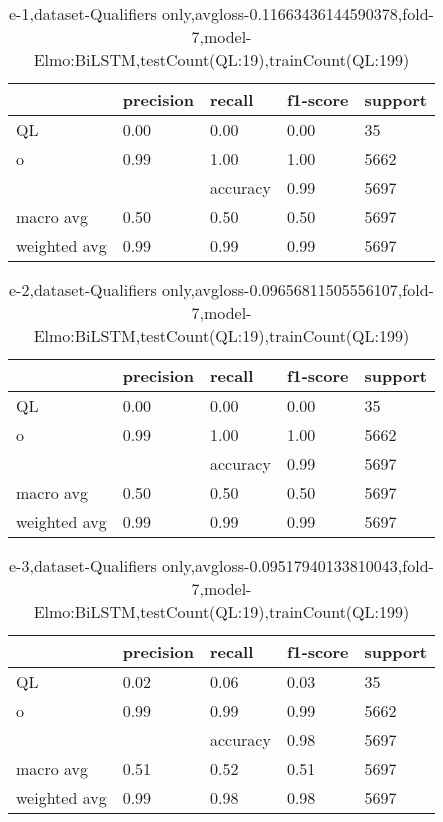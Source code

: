 \begin{table}[!ht] 
\centering
\caption{e-1,dataset-Qualifiers only,avgloss-0.11663436144590378,fold-7,model-Elmo:BiLSTM,testCount(QL:19),trainCount(QL:199)}\label{e-1data-qualS.tsv}
\begin{tabularx}{300pt}{|X|X|X|X|X|}
\hline
&precision&recall&f1-score&support\\
\hline
QL&0.00&0.00&0.00&35\\
\hline
o&0.99&1.00&1.00&5662\\
\hline
&&accuracy&0.99&5697\\
\hline
macro avg&0.50&0.50&0.50&5697\\
\hline
weighted avg&0.99&0.99&0.99&5697\\
\hline
\end{tabularx}
\end{table}
\begin{table}[!ht] 
\centering
\caption{e-2,dataset-Qualifiers only,avgloss-0.09656811505556107,fold-7,model-Elmo:BiLSTM,testCount(QL:19),trainCount(QL:199)}\label{e-2data-qualS.tsv}
\begin{tabularx}{300pt}{|X|X|X|X|X|}
\hline
&precision&recall&f1-score&support\\
\hline
QL&0.00&0.00&0.00&35\\
\hline
o&0.99&1.00&1.00&5662\\
\hline
&&accuracy&0.99&5697\\
\hline
macro avg&0.50&0.50&0.50&5697\\
\hline
weighted avg&0.99&0.99&0.99&5697\\
\hline
\end{tabularx}
\end{table}
\begin{table}[!ht] 
\centering
\caption{e-3,dataset-Qualifiers only,avgloss-0.09517940133810043,fold-7,model-Elmo:BiLSTM,testCount(QL:19),trainCount(QL:199)}\label{e-3data-qualS.tsv}
\begin{tabularx}{300pt}{|X|X|X|X|X|}
\hline
&precision&recall&f1-score&support\\
\hline
QL&0.02&0.06&0.03&35\\
\hline
o&0.99&0.99&0.99&5662\\
\hline
&&accuracy&0.98&5697\\
\hline
macro avg&0.51&0.52&0.51&5697\\
\hline
weighted avg&0.99&0.98&0.98&5697\\
\hline
\end{tabularx}
\end{table}
